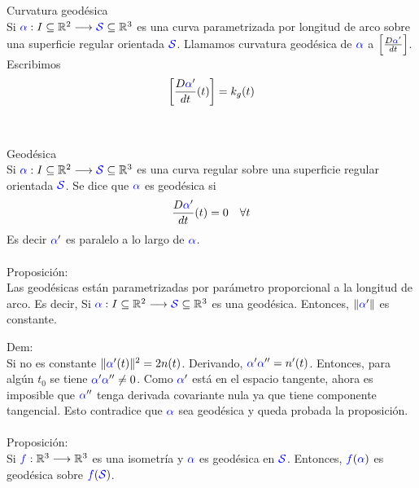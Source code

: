 \documentclass{article}
\newcommand{\bb}[1]{\mathbb{#1}}
\begin{document}
\textcolor{WildStrawberry}{Curvatura geodésica}\\
Si $\textcolor{blue}{\alpha}: I\subseteq \bb{R}^2 \longrightarrow \textcolor{blue}{\mathcal{S}}\subseteq \bb{R}^3$ es una curva parametrizada por longitud de arco sobre una superficie regular orientada $\textcolor{blue}{\mathcal{S}}$. Llamamos \textcolor{WildStrawberry}{curvatura geodésica de} $\textcolor{blue}{\alpha}$ a $\left[\frac{D \textcolor{blue}{\alpha}'}{dt}\right]$. Escribimos
$$
\left[\frac{D \textcolor{blue}{\alpha}'}{dt}(t)\right] = k_g(t)
$$\\\\

\textcolor{WildStrawberry}{Geodésica}\\
Si $\textcolor{blue}{\alpha}: I\subseteq \bb{R}^2 \longrightarrow \textcolor{blue}{\mathcal{S}}\subseteq \bb{R}^3$ es una curva regular sobre una superficie regular orientada $\textcolor{blue}{\mathcal{S}}$. Se dice que $\textcolor{blue}{\alpha}$ es \textcolor{WildStrawberry}{geodésica} si
$$
\frac{D \textcolor{blue}{\alpha}'}{dt}(t) = 0 \quad \forall t
$$
Es decir $\textcolor{blue}{\alpha}'$ es paralelo a lo largo de $\textcolor{blue}{\alpha}$.\\\\

\textcolor{WildStrawberry}{Proposición:}\\
Las geodésicas están parametrizadas por parámetro proporcional a la longitud de arco. Es decir, Si $\textcolor{blue}{\alpha}: I\subseteq \bb{R}^2 \longrightarrow \textcolor{blue}{\mathcal{S}}\subseteq \bb{R}^3$ es una geodésica. Entonces, $\| \textcolor{blue}{\alpha}' \|$ es constante.

\textcolor{WildStrawberry}{Dem:}\\
Si no es constante $\| \textcolor{blue}{\alpha}'(t) \|^2 = 2 n(t)$. Derivando, $\textcolor{blue}{\alpha}'\textcolor{blue}{\alpha}'' = n'(t)$. Entonces, para algún $t_0$ se tiene $\textcolor{blue}{\alpha}'\textcolor{blue}{\alpha}'' \ne 0$. Como $\textcolor{blue}{\alpha}'$ está en el espacio tangente, ahora es imposible que $\textcolor{blue}{\alpha}''$ tenga derivada covariante nula ya que tiene componente tangencial. Esto contradice que $\textcolor{blue}{\alpha}$ sea geodésica y queda probada la proposición.\\\\

\textcolor{WildStrawberry}{Proposición:}\\
Si $\textcolor{blue}{f}: \bb{R}^3 \longrightarrow \bb{R}^3$ es una isometría y $\textcolor{blue}{\alpha}$ es geodésica en $\textcolor{blue}{\mathcal{S}}$. Entonces, $\textcolor{blue}{f}(\textcolor{blue}{\alpha})$ es geodésica sobre $\textcolor{blue}{f}(\textcolor{blue}{\mathcal{S}})$.
\end{document}
